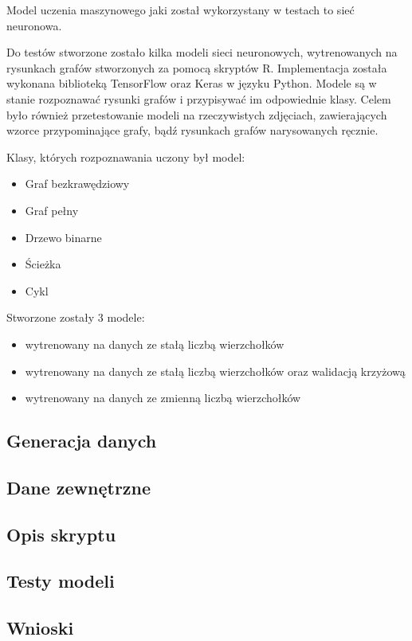 Model uczenia maszynowego jaki został wykorzystany w testach to sieć neuronowa.

Do testów stworzone zostało kilka modeli sieci neuronowych,
wytrenowanych na rysunkach grafów stworzonych za pomocą skryptów R.
Implementacja została wykonana biblioteką TensorFlow oraz Keras w języku Python.
Modele są w stanie rozpoznawać rysunki grafów i przypisywać im odpowiednie klasy.
Celem było również przetestowanie modeli na rzeczywistych zdjęciach,
zawierających wzorce przypominające grafy, bądź rysunkach grafów narysowanych ręcznie.

Klasy, których rozpoznawania uczony był model:
\begin{itemize}[label=-,labelsep=0.4cm,leftmargin=0.6cm]
	\item Graf bezkrawędziowy
	\item Graf pełny
	\item Drzewo binarne
	\item Ścieżka
	\item Cykl
\end{itemize}

Stworzone zostały 3 modele:
\begin{itemize}[label=-,labelsep=0.4cm,leftmargin=0.6cm]
	\item wytrenowany na danych ze stałą liczbą wierzchołków
	\item wytrenowany na danych ze stałą liczbą wierzchołków oraz walidacją krzyżową
	\item wytrenowany na danych ze zmienną liczbą wierzchołków
\end{itemize}

\subsection{Generacja danych}


\subsection{Dane zewnętrzne}


\subsection{Opis skryptu}


\subsection{Testy modeli}


\subsection{Wnioski}

